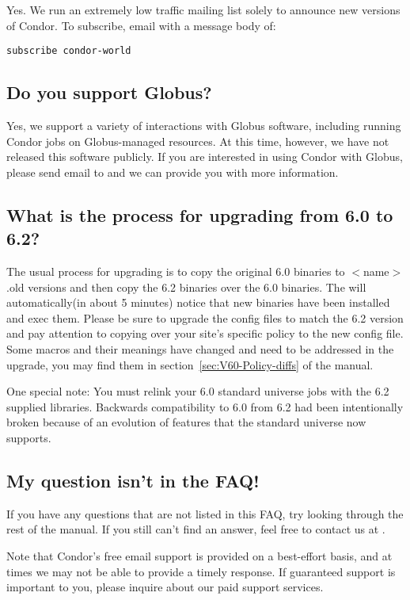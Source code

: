 Yes.
We run an extremely low traffic mailing list solely to announce new
versions of Condor.
To subscribe, email  with a message body
of:

\begin{verbatim}subscribe condor-world\end{verbatim}


\subsection{Do you support Globus?}

Yes, we support a variety of interactions with Globus software,
including running Condor jobs on Globus-managed resources.
At this time, however, we have not released this software publicly.
If you are interested in using Condor with Globus, please send email
to  and we can provide you with more
information.


\subsection{What is the process for upgrading from 6.0 to 6.2?}

The usual process for upgrading is to copy the original 6.0 binaries
to $<$name$>$.old versions and then copy the 6.2 binaries over the 6.0
binaries. The  will automatically(in about 5 minutes)
notice that new binaries have been installed and exec them. Please be sure
to upgrade the config files to match the 6.2 version and pay attention
to copying over your site's specific policy to the new config file. Some
macros and their meanings have changed and need to be addressed in the
upgrade, you may find them in section~\ref{sec:V60-Policy-diffs} of the
manual.

One special note: You must relink your 6.0 standard universe jobs with
the 6.2 supplied libraries. Backwards compatibility to 6.0 from 6.2 had
been intentionally broken because of an evolution of features that the
standard universe now supports.

\subsection{My question isn't in the FAQ!}

If you have any questions that are not listed in this FAQ, try looking
through the rest of the manual.
If you still can't find an answer, feel free to contact us at
.

Note that Condor's free email support is provided on a best-effort
basis, and at times we may not be able to provide a timely response.
If guaranteed support is important to you, please inquire about our
paid support services.




